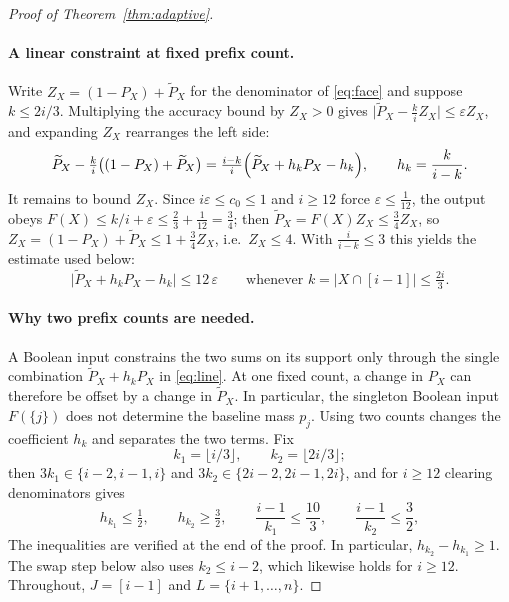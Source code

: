 \documentclass[10pt]{article} %
\theoremstyle{definition}
\begin{document}
\begin{proof}[Proof of Theorem~\ref{thm:adaptive}]
\paragraph{A linear constraint at fixed prefix count.}
Write \(Z_X=(1-P_X)+\widetilde P_X\) for the denominator of
\eqref{eq:face} and suppose \(k\le 2i/3\).  Multiplying the accuracy
bound by \(Z_X>0\) gives
\(\bigl|\widetilde P_X-\tfrac kiZ_X\bigr|\le\varepsilon Z_X\), and
expanding \(Z_X\) rearranges the left side:
\[
 \widetilde P_X-\tfrac ki\bigl((1-P_X)+\widetilde P_X\bigr)
 =\tfrac{i-k}i\Bigl(\widetilde P_X+h_kP_X-h_k\Bigr),
 \qquad h_k=\frac k{i-k}.
\]
It remains to bound \(Z_X\).  Since \(i\varepsilon\le c_0\le1\) and
\(i\ge12\) force \(\varepsilon\le\tfrac1{12}\), the output obeys
\(F(X)\le k/i+\varepsilon\le\tfrac23+\tfrac1{12}=\tfrac34\); then
\(\widetilde P_X=F(X)Z_X\le\tfrac34Z_X\), so
\(Z_X=(1-P_X)+\widetilde P_X\le1+\tfrac34Z_X\), i.e.\ \(Z_X\le4\).  With
\(\tfrac i{i-k}\le3\) this yields the estimate used below:
\begin{equation}\label{eq:line}
 \bigl|\widetilde P_X+h_kP_X-h_k\bigr|\le12\,\varepsilon
 \qquad\text{whenever } k=|X\cap[i-1]|\le\tfrac{2i}3 .
\end{equation}

\paragraph{Why two prefix counts are needed.}
A Boolean input constrains the two sums on its support only through the single
combination \(\widetilde P_X+h_kP_X\) in \eqref{eq:line}.  At one fixed
count, a change in \(P_X\) can therefore be offset by a change in
\(\widetilde P_X\).  In particular, the singleton Boolean input \(F(\{j\})\) does not
determine the baseline mass \(p_j\).  Using two counts changes the coefficient
\(h_k\) and separates the two terms.  Fix
\[
 k_1=\lfloor i/3\rfloor,
 \qquad
 k_2=\lfloor 2i/3\rfloor ;
\]
then \(3k_1\in\{i-2,i-1,i\}\) and \(3k_2\in\{2i-2,2i-1,2i\}\), and for
\(i\ge12\) clearing denominators gives
\begin{equation}\label{eq:dens}
 h_{k_1}\le\tfrac12,
 \qquad
 h_{k_2}\ge\tfrac32,
 \qquad
 \frac{i-1}{k_1}\le\frac{10}3,
 \qquad
 \frac{i-1}{k_2}\le\frac32,
\end{equation}
The inequalities are verified at the end of the proof.  In particular,
\(h_{k_2}-h_{k_1}\ge1\).  The swap step below also uses \(k_2\le i-2\),
which likewise holds for \(i\ge12\).  Throughout, \(J=[i-1]\) and
\(L=\{i+1,\dots,n\}\).


\end{proof}
\end{document}
